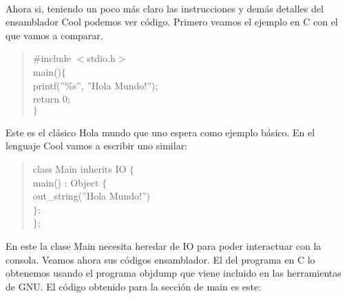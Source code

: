 \documentclass[10pt,a4paper]{article}
\begin{document}
\paragraph{}
Ahora si, teniendo un poco más claro las instrucciones y demás detalles del ensamblador Cool podemos ver código. Primero veamos el ejemplo en C con el que vamos a comparar.
\begin{quote}
\#include $<$stdio.h$>$\\
main()$\lbrace$ \\
	\- printf(''\%s'', ''Hola Mundo!''); \\
	\- return 0;\\
$\rbrace$
\end{quote}

Este es el clásico Hola mundo que uno espera como ejemplo básico. En el lenguaje Cool vamos a escribir uno similar:
\begin{quote}
class Main inherits IO $\lbrace$\\
\- main() : Object $\lbrace$\\ 
\-\- out\_string(''Hola Mundo!'') \\
\-$\rbrace$;\\
$\rbrace$;\\
\end{quote}

En este la clase Main necesita heredar de IO para poder interactuar con la consola. Veamos ahora sus códigos ensamblador. El del programa en C lo obtenemos usando el programa objdump que viene incluido en las herramientas de GNU. El código obtenido para la sección de main es este:
\end{document}
